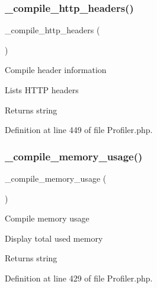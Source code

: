 \mbox{\label{class_c_i___profiler_a80a22812f0243b3daaf78e3614bddadb}} 
\subsubsection{\texorpdfstring{\_compile\_http\_headers()}{\_compile\_http\_headers()}}
{\footnotesize\ttfamily \+\_\+compile\+\_\+http\+\_\+headers (\begin{DoxyParamCaption}{ }\end{DoxyParamCaption})\hspace{0.3cm}{\ttfamily [protected]}}

Compile header information

Lists H\+T\+TP headers

\begin{DoxyReturn}{Returns}
string 
\end{DoxyReturn}


Definition at line 449 of file Profiler.\+php.

\mbox{\label{class_c_i___profiler_a409e57ba71d0463bb684925e2c6a5658}} 
\subsubsection{\texorpdfstring{\_compile\_memory\_usage()}{\_compile\_memory\_usage()}}
{\footnotesize\ttfamily \+\_\+compile\+\_\+memory\+\_\+usage (\begin{DoxyParamCaption}{ }\end{DoxyParamCaption})\hspace{0.3cm}{\ttfamily [protected]}}

Compile memory usage

Display total used memory

\begin{DoxyReturn}{Returns}
string 
\end{DoxyReturn}


Definition at line 429 of file Profiler.\+php.

\mbox{\label{class_c_i___profiler_a42ae55500668793b1cec3d79b6ea9209}} 
